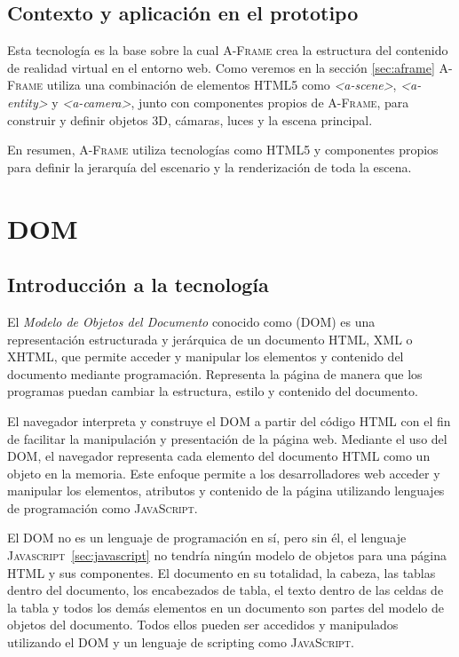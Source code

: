 \documentclass[a4paper, 11pt]{book}
\begin{document}
\subsection{Contexto y aplicación en el prototipo}
Esta tecnología es la base sobre la cual \textsc{A-Frame} crea la estructura del contenido de realidad virtual en el entorno web. 
Como veremos en la sección \ref{sec:aframe} \textsc{A-Frame} utiliza una combinación de elementos \textsc{HTML5} como \emph{\textless a-scene\textgreater}, \emph{\textless a-entity\textgreater} y \emph{\textless a-camera\textgreater}, junto con componentes propios de \textsc{A-Frame}, para construir y definir objetos \textsc{\gls{3D}}, cámaras, luces y la escena principal.

En resumen, \textsc{A-Frame} utiliza tecnologías como \textsc{HTML5} y componentes propios para definir la jerarquía del escenario y la \gls{renderización} de toda la escena.
\section{DOM}
\label{sec:dom}
\subsection{Introducción a la tecnología}
El \emph{Modelo de Objetos del Documento} conocido como (\textsc{DOM}) es una representación estructurada y jerárquica de un documento \textsc{HTML}, \textsc{XML} o \textsc{XHTML}, que permite acceder y manipular los elementos y contenido del documento mediante programación. Representa la página de manera que los programas puedan cambiar la estructura, estilo y contenido del documento.

El navegador interpreta y construye el \textsc{DOM} a partir del código \textsc{HTML} con el fin de facilitar la manipulación y presentación de la página web. Mediante el uso del \textsc{DOM}, el navegador representa cada elemento del documento \textsc{HTML} como un objeto en la memoria. Este enfoque permite a los desarrolladores web acceder y manipular los elementos, atributos y contenido de la página utilizando lenguajes de programación como \textsc{JavaScript}.

El DOM no es un lenguaje de programación en sí, pero sin él, el lenguaje \textsc{Javascript}~\ref{sec:javascript} no tendría ningún modelo de objetos para una página HTML y sus componentes. El documento en su totalidad, la cabeza, las tablas dentro del documento, los encabezados de tabla, el texto dentro de las celdas de la tabla y todos los demás elementos en un documento son partes del modelo de objetos del documento. Todos ellos pueden ser accedidos y manipulados utilizando el DOM y un lenguaje de scripting como \textsc{JavaScript}.
\end{document}

